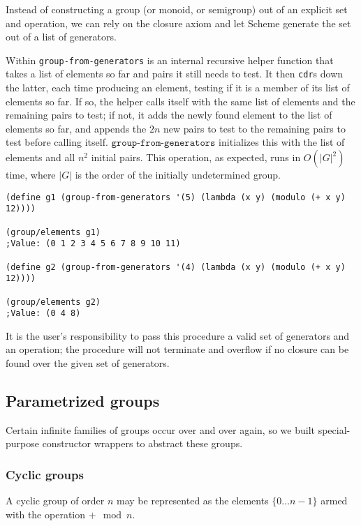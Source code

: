 \documentclass{article}
\begin{document}
            Instead of constructing a group (or monoid, or semigroup) out of an explicit set and operation, we can rely on the closure axiom and let Scheme generate the set out of a list of generators.
            
             Within \texttt{group-from-generators} is an internal recursive helper function that takes a list of elements so far and pairs it still needs to test. It then \texttt{cdr}s down the latter, each time producing an element, testing if it is a member of its list of elements so far. If so, the helper calls itself with the same list of elements and the remaining pairs to test; if not, it adds the newly found element to the list of elements so far, and appends the $2n$ new pairs to test to the remaining pairs to test before calling itself. $\texttt{group-from-generators}$ initializes this with the list of elements and all $n^2$ initial pairs. This operation, as expected, runs in $O(|G|^2)$ time, where $|G|$ is the order of the initially undetermined group. 
         
\begin{verbatim}
(define g1 (group-from-generators '(5) (lambda (x y) (modulo (+ x y) 12))))

(group/elements g1)
;Value: (0 1 2 3 4 5 6 7 8 9 10 11)

(define g2 (group-from-generators '(4) (lambda (x y) (modulo (+ x y) 12))))

(group/elements g2)
;Value: (0 4 8)
\end{verbatim}
         
            It is the user's responsibility to pass this procedure a valid set of generators and an operation; the procedure will not terminate and overflow if no closure can be found over the given set of generators.
        
        \subsection{Parametrized groups}
        
            Certain infinite families of groups occur over and over again, so we built special-purpose constructor wrappers to abstract these groups.
            
            \subsubsection{Cyclic groups}
            
                A cyclic group of order $n$ may be represented as the elements $\{0 \ldots n-1\}$ armed with the operation $+ \mod n$.
        
\end{document}
